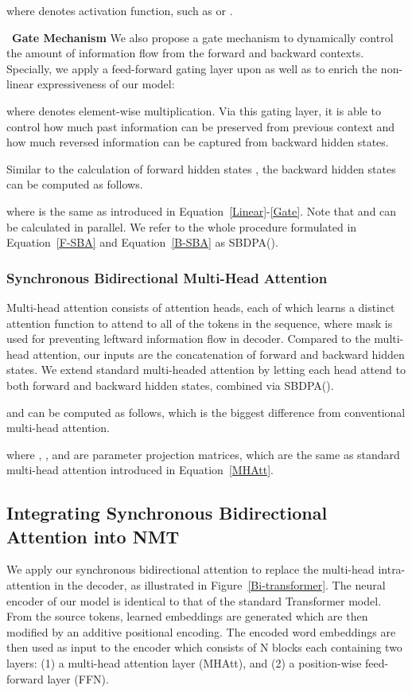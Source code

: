 \documentclass[11pt,a4paper]{article}
\begin{document}
\begin{CJK*}{UTF8}{gbsn}
where  denotes activation function, such as  or .

~\textbf{Gate Mechanism} We also propose a gate mechanism to dynamically control the amount of information flow from the forward and backward contexts. Specially, we apply a feed-forward gating layer upon  as well as  to enrich the non-linear expressiveness of our model:

where  denotes element-wise multiplication.
Via this gating layer, it is able to control how much past information can be preserved from previous context and how much reversed information can be captured from backward hidden states.

Similar to the calculation of forward hidden states , the backward hidden states  can be computed as follows.

where  is the same as introduced in Equation~\ref{Linear}-\ref{Gate}. Note that  and  can be calculated in parallel.
We refer to the whole procedure formulated in Equation~\ref{F-SBA} and Equation~\ref{B-SBA} as SBDPA().


\subsubsection{Synchronous Bidirectional Multi-Head Attention} \label{SBMHA-sec}
Multi-head attention consists of  attention heads, each of which learns a distinct attention function to attend to all of the tokens in the sequence, where mask is used for preventing leftward information flow in decoder.
Compared to the multi-head attention, our inputs are the concatenation of forward and backward hidden states.
We extend standard multi-headed attention by letting each head attend to both forward and backward hidden states, combined via SBDPA().


and  can be computed as follows, which is the biggest difference from conventional multi-head attention.

where , ,  and  are parameter projection matrices, which are the same as standard multi-head attention introduced in Equation~\ref{MHAtt}.


\subsection{Integrating Synchronous Bidirectional Attention into NMT} \label{Integrating-sec}

We apply our synchronous bidirectional attention to replace the multi-head intra-attention in the decoder, as illustrated in Figure~\ref{Bi-transformer}.
The neural encoder of our model is identical to that of the standard Transformer model. From the source tokens, learned embeddings are generated which are then modified by an additive positional encoding. 
The encoded word embeddings are then used as input to the encoder which consists of N blocks each containing two layers: (1) a multi-head attention layer (MHAtt), and (2) a position-wise feed-forward layer (FFN).


\end{CJK*}
\end{document}
